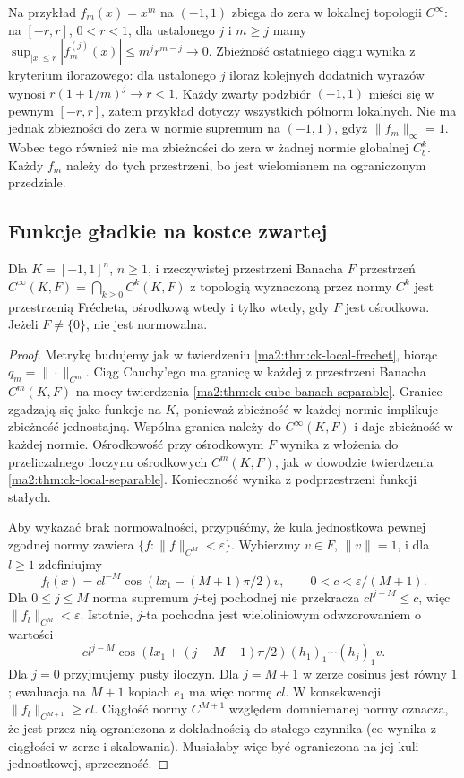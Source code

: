 Na przykład $f_m(x)=x^m$ na $(-1,1)$ zbiega
do zera w lokalnej topologii $C^\infty$:
na $[-r,r]$, $0<r<1$, dla ustalonego $j$ i
$m\ge j$ mamy
$\sup_{|x|\le r}|f_m^{(j)}(x)|\le m^j r^{m-j}\to0$.
Zbieżność ostatniego ciągu wynika z kryterium
ilorazowego: dla ustalonego $j$ iloraz
kolejnych dodatnich wyrazów wynosi
$r(1+1/m)^j\to r<1$.
Każdy zwarty podzbiór $(-1,1)$ mieści się
w pewnym $[-r,r]$, zatem przykład dotyczy
wszystkich półnorm lokalnych. Nie ma jednak
zbieżności do zera w normie supremum na
$(-1,1)$, gdyż $\|f_m\|_\infty=1$.
Wobec tego również nie ma zbieżności do zera
w żadnej normie globalnej $C_b^k$.
Każdy $f_m$ należy do tych przestrzeni,
bo jest wielomianem na ograniczonym przedziale.

\subsection{Funkcje gładkie na kostce zwartej}

\begin{wniosek}
\label{ma2:cor:cinfty-cube-frechet}
Dla $K=[-1,1]^n$, $n\ge1$, i rzeczywistej
przestrzeni Banacha $F$ przestrzeń
$C^\infty(K,F)=\bigcap_{k\ge0}C^k(K,F)$
z topologią wyznaczoną przez normy $C^k$
jest przestrzenią Frécheta, ośrodkową wtedy
i tylko wtedy, gdy $F$ jest ośrodkowa.
Jeżeli $F\ne\{0\}$, nie jest normowalna.
\end{wniosek}
\begin{proof}
Metrykę budujemy jak w twierdzeniu
\ref{ma2:thm:ck-local-frechet}, biorąc
$q_m=\|\cdot\|_{C^m}$. Ciąg Cauchy'ego
ma granicę w każdej z przestrzeni Banacha
$C^m(K,F)$ na mocy twierdzenia
\ref{ma2:thm:ck-cube-banach-separable}.
Granice zgadzają się jako funkcje na $K$,
ponieważ zbieżność w każdej normie implikuje
zbieżność jednostajną. Wspólna granica
należy do $C^\infty(K,F)$ i daje zbieżność
w każdej normie. Ośrodkowość przy ośrodkowym
$F$ wynika z włożenia do przeliczalnego
iloczynu ośrodkowych $C^m(K,F)$, jak w dowodzie
twierdzenia \ref{ma2:thm:ck-local-separable}.
Konieczność wynika z podprzestrzeni funkcji stałych.

Aby wykazać brak normowalności, przypuśćmy,
że kula jednostkowa pewnej zgodnej normy
zawiera $\{f:\|f\|_{C^M}<\varepsilon\}$.
Wybierzmy $v\in F$, $\|v\|=1$, i dla $l\ge1$
zdefiniujmy
\[
 f_l(x)=c l^{-M}\cos(lx_1-(M+1)\pi/2)v,
 \qquad 0<c<\varepsilon/(M+1).
\]
Dla $0\le j\le M$ norma supremum $j$-tej
pochodnej nie przekracza $c l^{j-M}\le c$,
więc $\|f_l\|_{C^M}<\varepsilon$.
Istotnie, $j$-ta pochodna jest wieloliniowym
odwzorowaniem o wartości
\[
 c l^{j-M}\cos(lx_1+(j-M-1)\pi/2)
             (h_1)_1\cdots(h_j)_1v.
\]
Dla $j=0$ przyjmujemy pusty iloczyn.
Dla $j=M+1$ w zerze cosinus jest równy $1$;
ewaluacja na $M+1$ kopiach $e_1$ ma więc
normę $cl$.
W konsekwencji $\|f_l\|_{C^{M+1}}\ge cl$.
Ciągłość normy $C^{M+1}$ względem domniemanej
normy oznacza, że jest przez nią ograniczona
z dokładnością do stałego czynnika
(co wynika z ciągłości w zerze i skalowania).
Musiałaby więc być ograniczona na jej
kuli jednostkowej, sprzeczność.
\end{proof}

